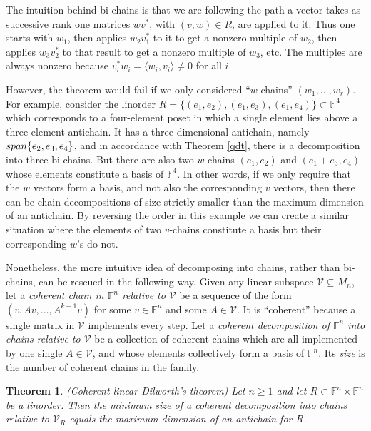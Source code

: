 \documentclass[10pt,a4paper]{amsart}
\newtheorem{thm}{Theorem}[section]
\begin{document}
The intuition behind bi-chains is that we are following the path a vector takes as successive rank one matrices $wv^*$, with $(v,w) \in R$, are applied to it. Thus one starts with $w_1$, then applies $w_2v_1^*$ to it to get a nonzero multiple of $w_2$, then applies $w_3v_2^*$ to that result to get a nonzero multiple of $w_3$, etc. The multiples are always nonzero because $v_i^*w_i = \langle w_i, v_i\rangle \neq 0$ for all $i$.

However, the theorem would fail if we only considered ``$w$-chains'' $(w_1, \ldots, w_r)$. For example, consider the linorder $R = \{(e_1, e_2), (e_1, e_3), (e_1, e_4)\} \subset \mathbb{F}^4$ which corresponds to a four-element poset in which a single element lies above a three-element antichain. It has a three-dimensional antichain, namely ${\rm span}\{e_2, e_3, e_4\}$, and in accordance with Theorem \ref{qdt}, there is a decomposition into three bi-chains. But there are also two $w$-chains $(e_1, e_2)$ and $(e_1 + e_3, e_4)$ whose elements constitute a basis of $\mathbb{F}^4$. In other words, if we only require that the $w$ vectors form a basis, and not also the corresponding $v$ vectors, then there can be chain decompositions of size strictly smaller than the maximum dimension of an antichain. By reversing the order in this example we can create a similar situation where the elements of two $v$-chains constitute a basis but their corresponding $w$'s do not.

Nonetheless, the more intuitive idea of decomposing into chains, rather than bi-chains, can be rescued in the following way. Given any linear subspace $\mathcal{V} \subseteq M_n$, let a {\it coherent chain in $\mathbb{F}^n$ relative to $\mathcal{V}$} be a sequence of the form $(v, Av, \ldots, A^{k-1} v)$ for some $v \in \mathbb{F}^n$ and some $A \in \mathcal{V}$. It is ``coherent'' because a single matrix in $\mathcal{V}$ implements every step. Let a {\it coherent decomposition of $\mathbb{F}^n$ into chains relative to $\mathcal{V}$} be a collection of coherent chains which are all implemented by one single $A \in \mathcal{V}$, and whose elements collectively form a basis of $\mathbb{F}^n$. Its {\it size} is the number of coherent chains in the family.

\begin{thm}\label{cqdt} (Coherent linear Dilworth's theorem)
Let $n \geq 1$ and let $R \subset \mathbb{F}^n\times \mathbb{F}^n$ be a linorder. Then the minimum size of a coherent decomposition into chains relative to $\mathcal{V}_R$ equals the maximum dimension of an antichain for $R$.
\end{thm}
\end{document}
